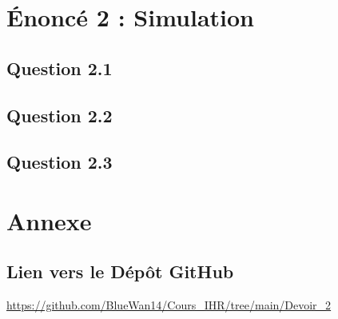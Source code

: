 \documentclass[a4paper,11pt]{article}
\begin{document}
\section{Énoncé 2 : Simulation}
\subsection{Question 2.1}

\subsection{Question 2.2}

\subsection{Question 2.3}

\section{Annexe}
\subsection{Lien vers le Dépôt GitHub}
\url{https://github.com/BlueWan14/Cours_IHR/tree/main/Devoir_2}
\end{document}
